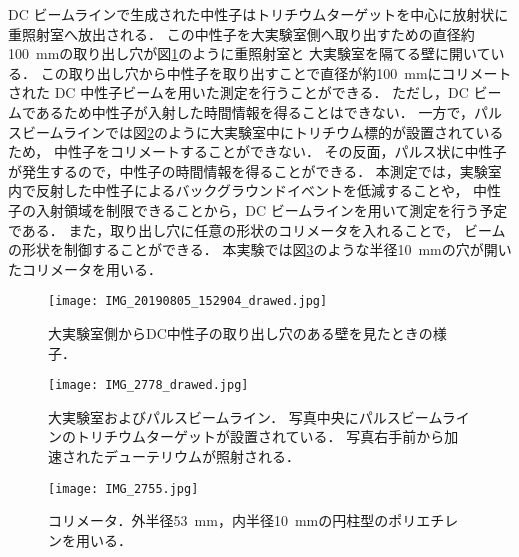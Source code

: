 \documentclass[../master]{subfiles}
\begin{document}
DC ビームラインで生成された中性子はトリチウムターゲットを中心に放射状に重照射室へ放出される．
この中性子を大実験室側へ取り出すための直径約\SI{100}{\milli\metre}の取り出し穴が図\ref{pic::hole}のように重照射室と
大実験室を隔てる壁に開いている．
この取り出し穴から中性子を取り出すことで直径が約\SI{100}{\milli\metre}にコリメートされた
DC 中性子ビームを用いた測定を行うことができる．
ただし，DC ビームであるため中性子が入射した時間情報を得ることはできない．
一方で，パルスビームラインでは図\ref{pic::pulse_beam_line}のように大実験室中にトリチウム標的が設置されているため，
中性子をコリメートすることができない．
その反面，パルス状に中性子が発生するので，中性子の時間情報を得ることができる．
本測定では，実験室内で反射した中性子によるバックグラウンドイベントを低減することや，
中性子の入射領域を制限できることから，DC ビームラインを用いて測定を行う予定である．
また，取り出し穴に任意の形状のコリメータを入れることで，
ビームの形状を制御することができる．
本実験では図\ref{pic::neutron_collimator}のような半径\SI{10}{\milli\metre}の穴が開いたコリメータを用いる．
\begin{figure}[h]
  \centering
  \texttt{[image: IMG\_20190805\_152904\_drawed.jpg]}
  \caption{大実験室側からDC中性子の取り出し穴のある壁を見たときの様子．}
  \label{pic::hole}
\end{figure}%
\begin{figure}[h]
  \centering
  \texttt{[image: IMG\_2778\_drawed.jpg]}
  \caption[大実験室およびパルスビームライン．]
          {大実験室およびパルスビームライン．
            写真中央にパルスビームラインのトリチウムターゲットが設置されている．
          写真右手前から加速されたデューテリウムが照射される．}
  \label{pic::pulse_beam_line}
\end{figure}%
\begin{figure}
  \centering
  \texttt{[image: IMG\_2755.jpg]}
  \caption{コリメータ．外半径\SI{53}{\milli\metre}，内半径\SI{10}{\milli\metre}の円柱型のポリエチレンを用いる．}
  \label{pic::neutron_collimator}
\end{figure}%
\end{document}
